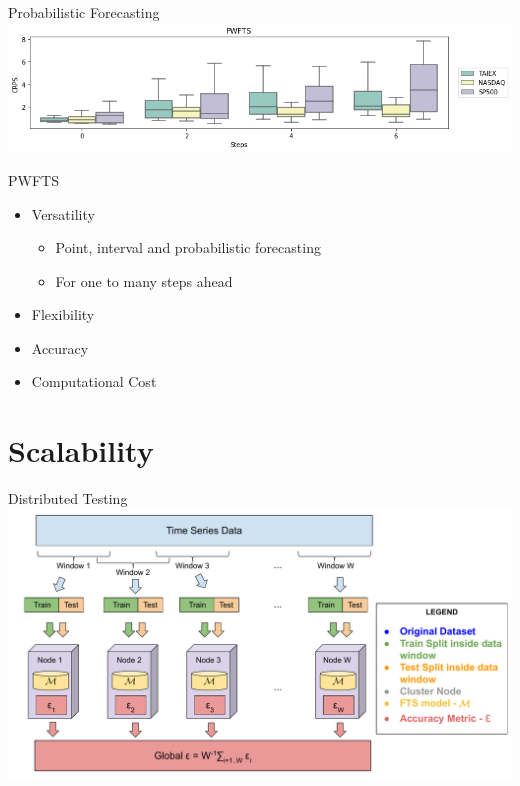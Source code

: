\documentclass{beamer}
\begin{document}
\begin{frame}{Probabilistic Forecasting}
\includegraphics[width=\textwidth]{figures/pwfts_ahead_probabilistic.png}
\end{frame}

\begin{frame}{PWFTS}
\linespread{2}
\begin{itemize}
    \item Versatility
    \begin{itemize}
        \item Point, interval and probabilistic forecasting
        \item For one to many steps ahead
    \end{itemize}
    \item Flexibility
    \item Accuracy
    \item Computational Cost
\end{itemize}
\end{frame}

\section{Scalability}

\begin{frame}{Distributed Testing}
\includegraphics[width=\textwidth]{figures/distributed_testing.pdf}
\end{frame}
\end{document}
